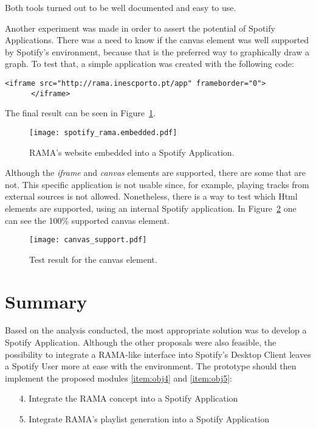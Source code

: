     Both tools turned out to be well documented and easy to use.

    Another experiment was made in order to assert the potential of Spotify Applications.
    There was a need to know if the canvas element was well supported by Spotify's environment, because that is the preferred way to graphically draw a graph.
    To test that, a simple application was created with the following code:

    \begin{lstlisting}[caption={\emph{iframe} element that allows to embed RAMA's website into the application.}, style=htmlcssjs]
      <iframe src="http://rama.inescporto.pt/app" frameborder="0">
      </iframe>\end{lstlisting}

    The final result can be seen in Figure~\ref{fig:rama_spotifyed}.
    \begin{figure}
      \begin{center}
        \texttt{[image: spotify\_rama.embedded.pdf]}
      \end{center}
      \caption{RAMA's website embedded into a Spotify Application.}
      \label{fig:rama_spotifyed}
    \end{figure}
    Although the \emph{iframe} and \emph{canvas} elements are supported, there are some that are not.
    This specific application is not usable since, for example, playing tracks from external sources is not allowed.
    Nonetheless, there is a way to test which Html elements are supported, using an internal Spotify application.
    In Figure~\ref{fig:canvas_support} one can see the 100\% supported canvas element.

    \begin{figure}[H]
       \begin{center}
         \texttt{[image: canvas\_support.pdf]}
       \end{center}
       \caption{Test result for the canvas element.}
       \label{fig:canvas_support}
     \end{figure}



\section{Summary}

  Based on the analysis conducted, the most appropriate solution was to develop a Spotify Application.
  Although the other proposals were also feasible, the possibility to integrate a RAMA-like interface into Spotify's Desktop Client leaves a Spotify User more at ease with the environment.
  The prototype should then implement the proposed modules \ref{item:obj4} and \ref{item:obj5}:

  \begin{itemize}
    \item[4.] Integrate the RAMA concept into a Spotify Application
    \item[5.] Integrate RAMA's playlist generation into a Spotify Application
  \end{itemize}
